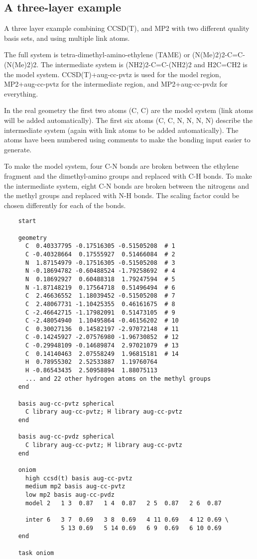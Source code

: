 \subsection{A three-layer example}
\label{sec:oniomeg3}

A three layer example combining CCSD(T), and MP2 with two different
quality basis sets, and using multiple link atoms.

The full system is tetra-dimethyl-amino-ethylene (TAME) or
(N(Me)2)2-C=C-(N(Me)2)2.  The intermediate system is (NH2)2-C=C-(NH2)2
and H2C=CH2 is the model system.  CCSD(T)+aug-cc-pvtz is used for the
model region, MP2+aug-cc-pvtz for the intermediate region, and
MP2+aug-cc-pvdz for everything.  

In the real geometry the first two atoms (C, C) are the model system
(link atoms will be added automatically).  The first six atoms (C, C,
N, N, N, N) describe the intermediate system (again with link atoms to
be added automatically).  The atoms have been numbered using comments
to make the bonding input easier to generate.  

To make the model system, four C-N bonds are broken between the
ethylene fragment and the dimethyl-amino groups and replaced with C-H
bonds.  To make the intermediate system, eight C-N bonds are broken
between the nitrogens and the methyl groups and replaced with N-H
bonds.  The scaling factor could be chosen differently for each of the
bonds.

\begin{verbatim}
    start 

    geometry 
      C  0.40337795 -0.17516305 -0.51505208  # 1
      C -0.40328664  0.17555927  0.51466084  # 2
      N  1.87154979 -0.17516305 -0.51505208  # 3
      N -0.18694782 -0.60488524 -1.79258692  # 4
      N  0.18692927  0.60488318  1.79247594  # 5
      N -1.87148219  0.17564718  0.51496494  # 6
      C  2.46636552  1.18039452 -0.51505208  # 7
      C  2.48067731 -1.10425355  0.46161675  # 8
      C -2.46642715 -1.17982091  0.51473105  # 9
      C -2.48054940  1.10495864 -0.46156202  # 10
      C  0.30027136  0.14582197 -2.97072148  # 11
      C -0.14245927 -2.07576980 -1.96730852  # 12
      C -0.29948109 -0.14689874  2.97021079  # 13
      C  0.14140463  2.07558249  1.96815181  # 14
      H  0.78955302  2.52533887  1.19760764
      H -0.86543435  2.50958894  1.88075113
      ... and 22 other hydrogen atoms on the methyl groups
    end

    basis aug-cc-pvtz spherical
      C library aug-cc-pvtz; H library aug-cc-pvtz
    end

    basis aug-cc-pvdz spherical
      C library aug-cc-pvtz; H library aug-cc-pvtz
    end

    oniom      
      high ccsd(t) basis aug-cc-pvtz
      medium mp2 basis aug-cc-pvtz
      low mp2 basis aug-cc-pvdz
      model 2   1 3  0.87   1 4  0.87   2 5  0.87   2 6  0.87

      inter 6   3 7  0.69   3 8  0.69   4 11 0.69   4 12 0.69 \
                5 13 0.69   5 14 0.69   6 9  0.69   6 10 0.69
    end

    task oniom
\end{verbatim}

